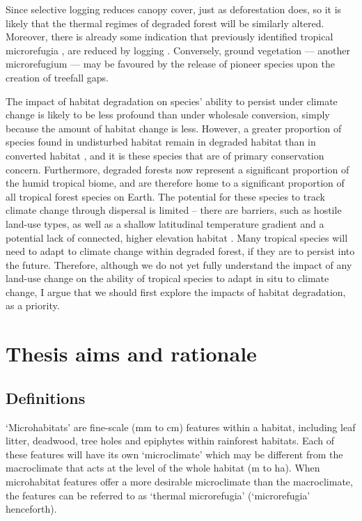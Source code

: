 \documentclass[12pt,a4paper,]{report}
\theoremstyle{definition}
\theoremstyle{definition}
\theoremstyle{definition}
\theoremstyle{remark}
\begin{document}
Since selective logging reduces canopy cover, just as deforestation
does, so it is likely that the thermal regimes of degraded forest will
be similarly altered. Moreover, there is already some indication that
previously identified tropical microrefugia \citep[in this case, leaf
litter and soil;][]{scheffers_microhabitats_2014}, are reduced by
logging \citep{saner_reduced_2009}. Conversely, ground vegetation ---
another microrefugium \citep{scheffers_microhabitats_2014} --- may be
favoured by the release of pioneer species upon the creation of treefall
gaps.

The impact of habitat degradation on species' ability to persist under
climate change is likely to be less profound than under wholesale
conversion, simply because the amount of habitat change is less.
However, a greater proportion of species found in undisturbed habitat
remain in degraded habitat than in converted habitat
\citep{edwards_degraded_2011}, and it is these species that are of
primary conservation concern. Furthermore, degraded forests now
represent a significant proportion of the humid tropical biome, and are
therefore home to a significant proportion of all tropical forest
species on Earth. The potential for these species to track climate
change through dispersal is limited -- there are barriers, such as
hostile land-use types, as well as a shallow latitudinal temperature
gradient \citep{colwell_global_2008} and a potential lack of connected,
higher elevation habitat \citep{scriven_protected_2015}. Many tropical
species will need to adapt to climate change within degraded forest, if
they are to persist into the future. Therefore, although we do not yet
fully understand the impact of any land-use change on the ability of
tropical species to adapt in situ to climate change, I argue that we
should first explore the impacts of habitat degradation, as a priority.

\section{Thesis aims and rationale}\label{thesis-aims-and-rationale-1}

\subsection{Definitions}\label{definitions}

`Microhabitats' are fine-scale (mm to cm) features within a habitat,
including leaf litter, deadwood, tree holes and epiphytes within
rainforest habitats. Each of these features will have its own
`microclimate' which may be different from the macroclimate that acts at
the level of the whole habitat (m to ha). When microhabitat features
offer a more desirable microclimate than the macroclimate, the features
can be referred to as `thermal microrefugia' (`microrefugia'
henceforth).
\end{document}
